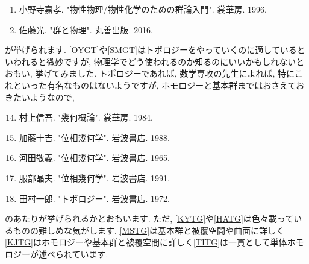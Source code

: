 \documentclass[10pt,a4paper]{jsarticle}
\begin{document}
\begin{itemize}
\begin{enumerate}
        \item \label{OYGT} 小野寺嘉孝. "物性物理/物性化学のための群論入門". 裳華房. 1996. 
        \item \label{SMGT} 佐藤光. "群と物理". 丸善出版. 2016. 
    \end{enumerate}
    が挙げられます. \ref{OYGT}や\ref{SMGT}はトポロジーをやっていくのに適しているといわれると微妙ですが, 物理学でどう使われるのか知るのにいいかもしれないとおもい, 挙げてみました. トポロジーであれば, 数学専攻の先生によれば, 特にこれといった有名なものはないようですが, ホモロジーと基本群まではおさえておきたいようなので, 
    \begin{enumerate}
    \setcounter{enumi}{13}
        \item \label{MSTG} 村上信吾. "幾何概論". 裳華房. 1984. 
        \item \label{KJTG} 加藤十吉. "位相幾何学". 岩波書店. 1988. 
        \item \label{KYTG} 河田敬義. "位相幾何学". 岩波書店. 1965. 
        \item \label{HATG} 服部晶夫. "位相幾何学". 岩波書店. 1991.
        \item \label{TITG} 田村一郎. "トポロジー". 岩波書店. 1972.
    \end{enumerate}
    のあたりが挙げられるかとおもいます. ただ, \ref{KYTG}や\ref{HATG}は色々載っているものの難しめな気がします. \ref{MSTG}は基本群と被覆空間や曲面に詳しく\ref{KJTG}はホモロジーや基本群と被覆空間に詳しく\ref{TITG}は一貫として単体ホモロジーが述べられています. 
\end{itemize}
\end{document}
